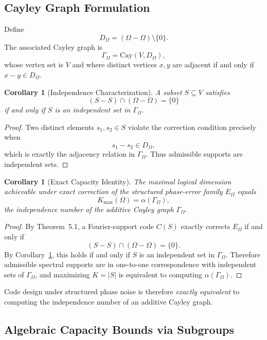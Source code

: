 \documentclass[a4paper,twocolumn,11pt,allowtoday]{quantumarticle}
\theoremstyle{plain}
\newtheorem{corollary}[theorem]{Corollary}
\theoremstyle{definition}
\theoremstyle{remark}
\begin{document}
\subsection{Cayley Graph Formulation}
\label{subsec:cayley_formulation}

Define
\[
D_\Omega = (\Omega-\Omega)\setminus\{0\}.
\]
The associated Cayley graph is
\[
\Gamma_\Omega
=
\mathrm{Cay}(V,D_\Omega),
\]
whose vertex set is $V$ and where distinct vertices $x,y$ are adjacent
if and only if $x-y \in D_\Omega$.

\begin{corollary}[Independence Characterization]
\label{cor:independence_characterization}
A subset $S \subseteq V$ satisfies
\[
(S-S)\cap(\Omega-\Omega)=\{0\}
\]
if and only if $S$ is an independent set in $\Gamma_\Omega$.
\end{corollary}

\begin{proof}
Two distinct elements $s_1,s_2\in S$ violate the correction condition
precisely when
\[
s_1-s_2 \in D_\Omega,
\]
which is exactly the adjacency relation in $\Gamma_\Omega$.
Thus admissible supports are independent sets.
\end{proof}

\begin{corollary}[Exact Capacity Identity]
\label{cor:exact_capacity_identity}
The maximal logical dimension achievable under exact correction
of the structured phase-error family $E_\Omega$ equals
\[
K_{\max}(\Omega)
=
\alpha(\Gamma_\Omega),
\]
the independence number of the additive Cayley graph
$\Gamma_\Omega$.
\end{corollary}

\begin{proof}
By Theorem~5.1, a Fourier-support code $C(S)$ exactly corrects
$E_\Omega$ if and only if
\[
(S-S)\cap(\Omega-\Omega)=\{0\}.
\]
By Corollary~\ref{cor:independence_characterization}, this holds
if and only if $S$ is an independent set in $\Gamma_\Omega$.
Therefore admissible spectral supports are in one-to-one
correspondence with independent sets of $\Gamma_\Omega$,
and maximizing $K=|S|$ is equivalent to computing
$\alpha(\Gamma_\Omega)$.
\end{proof}

Code design under structured phase noise is therefore
\emph{exactly equivalent} to computing the independence number
of an additive Cayley graph.




\subsection{Algebraic Capacity Bounds via Subgroups}
\label{subsec:subgroup_bounds}
\end{document}
